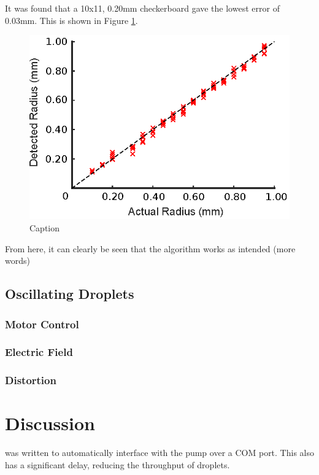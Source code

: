 \documentclass{physics_article_B}
\begin{document}
    
    It was found that a 10x11, 0.20mm checkerboard gave the lowest error of 0.03mm. This is shown in Figure \ref{fig:calibsize}. 
        
            \begin{figure}[H]
                \centering
                \hspace*{-1cm}\includegraphics{Figures/CameraCalib.eps}
                \caption{Caption}
                \label{fig:calibsize}
            \end{figure}
        
        From here, it can clearly be seen that the algorithm works as intended (more words)

    \subsection{Oscillating Droplets}
        \subsubsection{Motor Control}
        \subsubsection{Electric Field}
        \subsubsection{Distortion}
    
\section{Discussion}

was written to automatically interface with the pump over a COM port. This also has a significant delay, reducing the throughput of droplets.\\


\newpage



    

\end{document}
